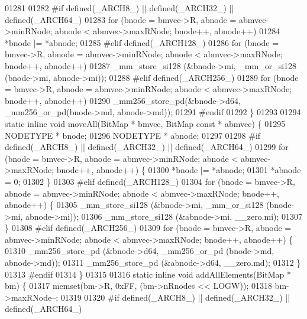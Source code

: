 \begin{DoxyCode}
{01281 
01282 \textcolor{preprocessor}{#if defined(\_ARCH8\_) || defined(\_ARCH32\_) || defined(\_ARCH64\_)}
01283         \textcolor{keywordflow}{for} (bnode = bmvec->R, abnode = abmvec->minRNode; abnode < abmvec->maxRNode; bnode++, abnode++)
01284                 *bnode |= *abnode;
01285 \textcolor{preprocessor}{#elif defined(\_ARCH128\_)}
01286         \textcolor{keywordflow}{for} (bnode = bmvec->R, abnode = abmvec->minRNode; abnode < abmvec->maxRNode; bnode++, abnode++)
01287                 \_mm\_store\_si128 (&bnode->mi, \_mm\_or\_si128 (bnode->mi, abnode->mi));
01288 \textcolor{preprocessor}{#elif defined(\_ARCH256\_)}
01289         \textcolor{keywordflow}{for} (bnode = bmvec->R, abnode = abmvec->minRNode; abnode < abmvec->maxRNode; bnode++, abnode++)
01290                 \_mm256\_store\_pd(&bnode->d64, \_mm256\_or\_pd(bnode->md, abnode->md));
01291 \textcolor{preprocessor}{#endif}
01292 \}
01293 
01294 \textcolor{keyword}{static} \textcolor{keyword}{inline} \textcolor{keywordtype}{void} moveAll(BitMap * bmvec, BitMap \textcolor{keyword}{const} * abmvec) \{
01295         NODETYPE * bnode;
01296         NODETYPE * abnode;
01297 
01298 \textcolor{preprocessor}{#if defined(\_ARCH8\_) || defined(\_ARCH32\_) || defined(\_ARCH64\_)}
01299         \textcolor{keywordflow}{for} (bnode = bmvec->R, abnode = abmvec->minRNode; abnode < abmvec->maxRNode; bnode++, abnode++) \{
01300                 *bnode |= *abnode;
01301                 *abnode = 0;
01302         \}
01303 \textcolor{preprocessor}{#elif defined(\_ARCH128\_)}
01304         \textcolor{keywordflow}{for} (bnode = bmvec->R, abnode = abmvec->minRNode; abnode < abmvec->maxRNode; bnode++, abnode++) \{
01305                 \_mm\_store\_si128 (&bnode->mi, \_mm\_or\_si128 (bnode->mi, abnode->mi));
01306                 \_mm\_store\_si128 (&abnode->mi, \_\_zero.mi);
01307         \}
01308 \textcolor{preprocessor}{#elif defined(\_ARCH256\_)}
01309         \textcolor{keywordflow}{for} (bnode = bmvec->R, abnode = abmvec->minRNode; abnode < abmvec->maxRNode; bnode++, abnode++) \{
01310                 \_mm256\_store\_pd (&bnode->d64, \_mm256\_or\_pd (bnode->md, abnode->md));
01311                 \_mm256\_store\_pd (&abnode->d64, \_\_zero.md);
01312         \}
01313 \textcolor{preprocessor}{#endif}
01314 \}
01315 
01316 \textcolor{keyword}{static} \textcolor{keyword}{inline} \textcolor{keywordtype}{void} addAllElements(BitMap * bm) \{
01317         memset(bm->R, 0xFF, (bm->nRnodes << LOGW));
01318         bm->maxRNode--;
01319 
01320 \textcolor{preprocessor}{#if defined(\_ARCH8\_) || defined(\_ARCH32\_) || defined(\_ARCH64\_)}
}
\end{DoxyCode}

